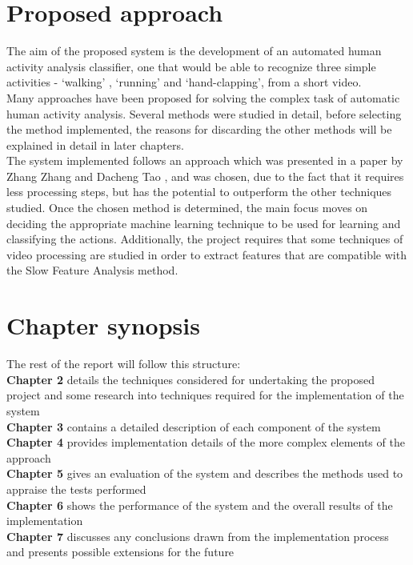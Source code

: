 \documentclass[11pt]{report}
\begin{document}
\section{Proposed approach}

The aim of the proposed system is the development of an automated human activity analysis classifier, one that would be able to recognize three simple activities - `walking' , `running' and `hand-clapping', from a short video. \\
 Many approaches have been proposed for solving the complex task of automatic human activity analysis. Several methods were studied in detail, before selecting the method implemented, the reasons for discarding the other methods will be explained in detail in later chapters. \\
The system implemented follows an approach which was presented in a paper by Zhang Zhang and Dacheng Tao \cite{main}, and was chosen, due to the fact that it requires less processing steps, but has the potential to outperform the other techniques studied. Once the chosen method is determined, the main focus moves on deciding the appropriate machine learning technique to be used for learning and classifying the actions. Additionally, the project requires that some techniques of video processing are studied in order to extract features that are compatible with the Slow Feature Analysis method. \\

\section{Chapter synopsis}
The rest of the report will follow this structure:\\
\textbf{Chapter 2} details the techniques considered for undertaking the proposed project and some research into techniques required for the implementation of the system\\
\textbf{Chapter 3} contains a detailed description of each component of the system\\
\textbf{Chapter 4} provides implementation details of the more complex elements of the approach\\
\textbf{Chapter 5} gives an evaluation of the system and describes the methods used to appraise the tests performed\\
\textbf{Chapter 6} shows the performance of the system and the overall results of the implementation\\
\textbf{Chapter 7} discusses any conclusions drawn from the implementation process and presents possible extensions for the future \\
\end{document}
